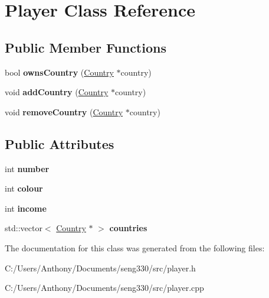 \hypertarget{class_player}{}\section{Player Class Reference}
\label{class_player}
\subsection*{Public Member Functions}
\begin{DoxyCompactItemize}
\item 
\hypertarget{class_player_afb5d7b209f1a554deb921d60433130a0}{}bool {\bfseries owns\+Country} (\hyperlink{class_country}{Country} $\ast$country)\label{class_player_afb5d7b209f1a554deb921d60433130a0}

\item 
\hypertarget{class_player_af5fb0c8aff4eb80c072e958707b1f6d6}{}void {\bfseries add\+Country} (\hyperlink{class_country}{Country} $\ast$country)\label{class_player_af5fb0c8aff4eb80c072e958707b1f6d6}

\item 
\hypertarget{class_player_a6da51346f6a07b872e2c35faca141191}{}void {\bfseries remove\+Country} (\hyperlink{class_country}{Country} $\ast$country)\label{class_player_a6da51346f6a07b872e2c35faca141191}

\end{DoxyCompactItemize}
\subsection*{Public Attributes}
\begin{DoxyCompactItemize}
\item 
\hypertarget{class_player_af14f0d6ce7546bc1ded859df40cd8819}{}int {\bfseries number}\label{class_player_af14f0d6ce7546bc1ded859df40cd8819}

\item 
\hypertarget{class_player_ab5d1eafeb6c33bbe5bfc3205a3adf36d}{}int {\bfseries colour}\label{class_player_ab5d1eafeb6c33bbe5bfc3205a3adf36d}

\item 
\hypertarget{class_player_add605b5c083c3391c3d1abf000471731}{}int {\bfseries income}\label{class_player_add605b5c083c3391c3d1abf000471731}

\item 
\hypertarget{class_player_abc6528de5a3f2cb217723a553492b4c2}{}std\+::vector$<$ \hyperlink{class_country}{Country} $\ast$ $>$ {\bfseries countries}\label{class_player_abc6528de5a3f2cb217723a553492b4c2}

\end{DoxyCompactItemize}


The documentation for this class was generated from the following files\+:\begin{DoxyCompactItemize}
\item 
C\+:/\+Users/\+Anthony/\+Documents/seng330/src/player.\+h\item 
C\+:/\+Users/\+Anthony/\+Documents/seng330/src/player.\+cpp\end{DoxyCompactItemize}
